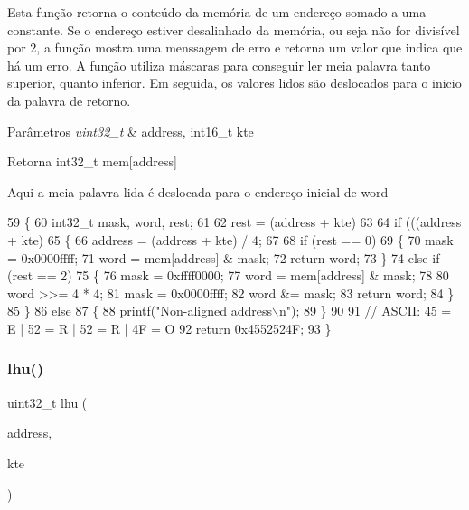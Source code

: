 Esta função retorna o conteúdo da memória de um endereço somado a uma constante. Se o endereço estiver desalinhado da memória, ou seja não for divisível por 2, a função mostra uma menssagem de erro e retorna um valor que indica que há um erro. A função utiliza máscaras para conseguir ler meia palavra tanto superior, quanto inferior. Em seguida, os valores lidos são deslocados para o inicio da palavra de retorno. 
\begin{DoxyParams}{Parâmetros}
{\em uint32\+\_\+t} & address, int16\+\_\+t kte \\
\hline
\end{DoxyParams}
\begin{DoxyReturn}{Retorna}
int32\+\_\+t mem[address] 
\end{DoxyReturn}
Aqui a meia palavra lida é deslocada para o endereço inicial de word 
\begin{DoxyCode}
59 \{
60     int32\_t mask, word, rest;
61 
62     rest = (address + kte) %
63 
64     \textcolor{keywordflow}{if} (((address + kte) %
65     \{
66         address = (address + kte) / 4;
67 
68         \textcolor{keywordflow}{if} (rest == 0)
69         \{
70             mask = 0x0000ffff;
71             word = mem[address] & mask;
72             \textcolor{keywordflow}{return} word;
73         \}
74         \textcolor{keywordflow}{else} \textcolor{keywordflow}{if} (rest == 2)
75         \{
76             mask = 0xffff0000;
77             word = mem[address] & mask;
78 
80             word >>= 4 * 4;
81             mask = 0x0000ffff;
82             word &= mask;
83             \textcolor{keywordflow}{return} word;
84         \}
85     \}
86     \textcolor{keywordflow}{else}
87     \{
88         printf(\textcolor{stringliteral}{"Non-aligned address\(\backslash\)n"});
89     \}
90 
91     \textcolor{comment}{// ASCII: 45 = E | 52 = R | 52 = R | 4F = O}
92     \textcolor{keywordflow}{return} 0x4552524F;
93 \}
\end{DoxyCode}
\mbox{\label{memory_8h_a391d3cd477ef6d8a7fd469a3a032b7d8}} 
\subsubsection{lhu()}
{\footnotesize\ttfamily uint32\+\_\+t lhu (\begin{DoxyParamCaption}\item[{uint32\+\_\+t}]{address,  }\item[{int16\+\_\+t}]{kte }\end{DoxyParamCaption})}



